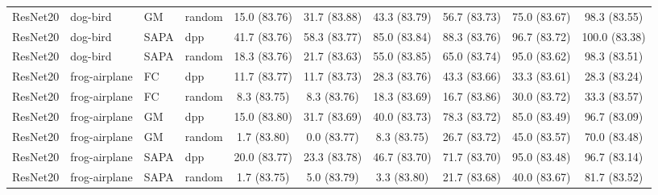 \begin{table}[h]
{\begin{tabular}{llllcccccc}
ResNet20 & dog-bird & GM & random
& 15.0 \small{(83.76)}
& 31.7 \small{(83.88)}
& 43.3 \small{(83.79)}
& 56.7 \small{(83.73)}
& 75.0 \small{(83.67)}
& 98.3 \small{(83.55)} \\ [1em]

ResNet20 & dog-bird & SAPA & dpp
& 41.7 \small{(83.76)}
& 58.3 \small{(83.77)}
& 85.0 \small{(83.84)}
& 88.3 \small{(83.76)}
& 96.7 \small{(83.72)}
& 100.0 \small{(83.38)}\\



ResNet20 & dog-bird & SAPA & random
& 18.3 \small{(83.76)}
& 21.7 \small{(83.63)}
& 55.0 \small{(83.85)}
& 65.0 \small{(83.74)}
& 95.0 \small{(83.62)}
& 98.3 \small{(83.51)} \\ [1em]



ResNet20 & frog-airplane & FC & dpp
& 11.7 \small{(83.77)}
& 11.7 \small{(83.73)}
& 28.3 \small{(83.76)}
& 43.3 \small{(83.66)}
& 33.3 \small{(83.61)}
& 28.3 \small{(83.24)} \\


ResNet20 & frog-airplane & FC & random
& 8.3 \small{(83.75)}
& 8.3 \small{(83.76)}
& 18.3 \small{(83.69)}
& 16.7 \small{(83.86)}
& 30.0 \small{(83.72)}
& 33.3 \small{(83.57)} \\ [1em]



ResNet20 & frog-airplane & GM & dpp
& 15.0 \small{(83.80)}
& 31.7 \small{(83.69)}
& 40.0 \small{(83.73)}
& 78.3 \small{(83.72)}
& 85.0 \small{(83.49)}
& 96.7 \small{(83.09)} \\


ResNet20 & frog-airplane & GM & random
& 1.7 \small{(83.80)}
& 0.0 \small{(83.77)}
& 8.3 \small{(83.75)}
& 26.7 \small{(83.72)}
& 45.0 \small{(83.57)}
& 70.0 \small{(83.48)} \\ [1em]

ResNet20 & frog-airplane & SAPA & dpp
& 20.0 \small{(83.77)}
& 23.3 \small{(83.78)}
& 46.7 \small{(83.70)}
& 71.7 \small{(83.70)}
& 95.0 \small{(83.48)}
& 96.7 \small{(83.14)}\\



ResNet20 & frog-airplane & SAPA & random
& 1.7 \small{(83.75)}
& 5.0 \small{(83.79)}
& 3.3 \small{(83.80)}
& 21.7 \small{(83.68)}
& 40.0 \small{(83.67)}
& 81.7 \small{(83.52)} \\ [0.1em]


\hline






\end{tabular}}
\end{table}
